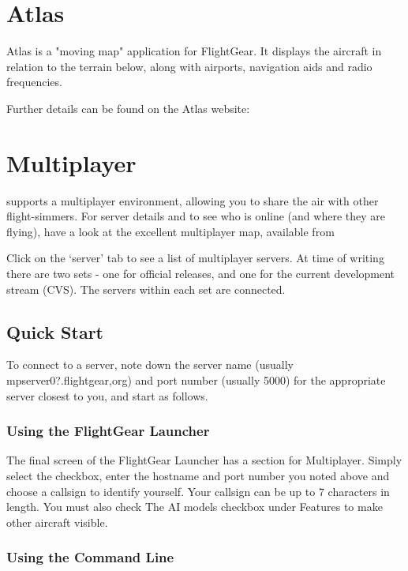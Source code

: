 \section{Atlas\label{Atlas}}

Atlas is a "moving map" application for FlightGear. It displays the aircraft in relation to the terrain below, 
along with airports, navigation aids and radio frequencies. 

Further details can be found on the Atlas website:

\noindent
{}

\section{Multiplayer}

\FlightGear{} supports a multiplayer environment, allowing you to share the air with other flight-simmers. 
For server details and to see who is online (and where they are flying), have a look at the excellent multiplayer map, available from

\noindent
{}

Click on the `server' tab to see a list of multiplayer servers. At time of writing there are two sets - one for official \FlightGear{} releases,
and one for the current development stream (CVS). The servers within each set are connected. 
\subsection{Quick Start}

To connect to a server, note down the server name (usually mpserver0?.flightgear,org) and port number (usually 5000) for the appropriate 
server
closest to you, and start \FlightGear{} as follows.

\subsubsection{Using the FlightGear Launcher}

The final screen of the FlightGear Launcher has a section for Multiplayer. 
Simply select the checkbox, enter the hostname and port 
number you noted above and choose a callsign to identify yourself. 
Your callsign can be up to 7 characters in length. 
You must also check The AI models checkbox under Features to make other aircraft visible.

\subsubsection{Using the Command Line}

